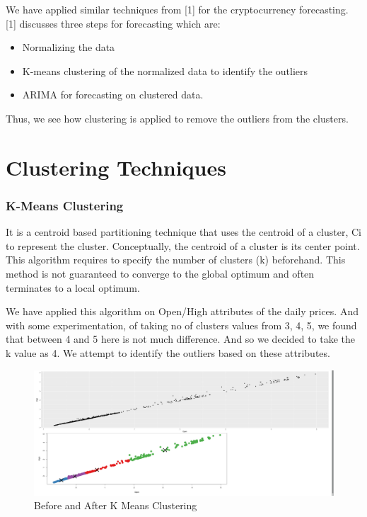 \documentclass{article}
\begin{document}
We have applied similar techniques from [1] for the cryptocurrency forecasting.
[1] discusses three steps for forecasting which are:
\begin{itemize}
	\item Normalizing the data
	\item K-means clustering of the normalized data to identify the outliers
	\item ARIMA for forecasting on clustered data.
\end{itemize}

Thus, we see how clustering is applied to remove the outliers from the clusters.


\section{Clustering Techniques}
\subsubsection{K-Means Clustering}

It is a centroid based partitioning technique that uses the centroid of a cluster, Ci to represent the cluster. Conceptually, the centroid of a cluster is its center point. This algorithm requires to specify the number of clusters (k) beforehand. This method is not guaranteed to converge to the global optimum and often terminates to a local optimum.

We have applied this algorithm on Open/High attributes of the daily prices. And with some experimentation, of taking no of clusters values from 3, 4, 5, we found that between 4 and 5 here is not much difference. And so we decided to take the k value as 4. We attempt to identify the outliers based on these attributes.

\begin{figure}
	\centering
	\includegraphics[width=\linewidth]{images/KMeansClustering}
	\caption{Before and After K Means Clustering}
	\label{fig:kmeansclustering}
\end{figure}
\end{document}
